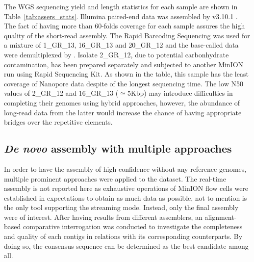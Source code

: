 The WGS sequencing yield and length statistics for each sample are shown in Table~\ref{tab:assers_stats}. 
Illumina paired-end data was assembled by \spades{} v3.10.1 \cite{BankevichNA2012}. The fact of having more than 60-folds coverage for each sample assures the high quality of the short-read assembly.
The Rapid Barcoding Sequencing was used for a mixture of 1\_GR\_13, 16\_GR\_13 and 20\_GR\_12 and the base-called data were demultiplexed by \npbarcode{}. Isolate 2\_GR\_12, due to potential carbonhydrate contamination, has been prepared separately and subjected to another MinION run using Rapid Sequencing Kit. As shown in the table, this sample has the least coverage of Nanopore data despite of the longest sequencing time. The low N50 values of 2\_GR\_12 and 16\_GR\_13 ($\simeq 5$Kbp) may introduce difficulties in completing their genomes using hybrid approaches, however, the abundance of long-read data from the latter would increase the chance of having appropriate bridges over the repetitive elements.
\subsection{\emph{De novo} assembly with multiple approaches}
In order to have the assembly of high confidence without any reference genomes, multiple prominent approaches were applied to the dataset. 
The real-time assembly is not reported here as exhaustive operations of MinION flow cells were established in expectations to obtain as much data as possible, not to mention \npscarf{} is the only tool supporting the streaming mode. Instead, only the final assembly were of interest. 
After having results from different assemblers, an alignment-based comparative interrogation was conducted to investigate the completeness and quality of each contigs in relations with its corresponding counterparts.
By doing so, the consensus sequence can be determined as the best candidate among all.

